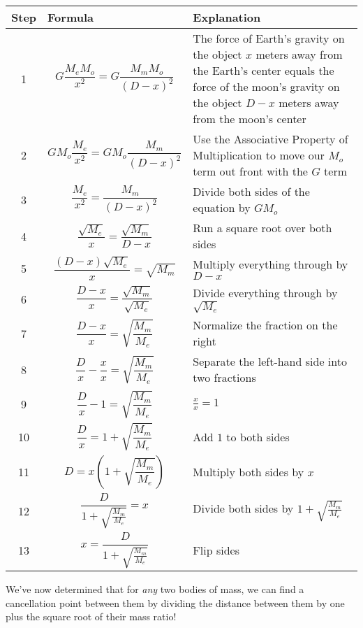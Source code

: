 \documentclass[10pt,letterpaper]{report}
\begin{document}
\begin{longtable}{| c | p{} | p{} |}
  \hline
  Step & Formula & Explanation \\
  \hline \endhead
  \rowcolor[gray]{0.95} 1 & \[ G\frac{M_e M_o}{x^2} = G\frac{M_m M_o}{(D - x)^2} \] & The
    force of Earth's gravity on the object $x$ meters away from the
    Earth's center equals the force of the moon's gravity on the
    object $D - x$ meters away from the moon's center\\
    \hline
  2 & \[ GM_o \frac{M_e}{x^2} = GM_o\frac{M_m}{(D - x)^2} \] & Use the
  Associative Property of Multiplication to move our $M_o$ term out
  front with the $G$ term \\
  \hline
  \rowcolor[gray]{0.95} 3 & \[ \frac{M_e}{x^2} = \frac{M_m}{(D - x)^2} \] & Divide both
  sides of the equation by $GM_o$ \\
  \hline
  4 & \[ \frac{\sqrt{M_e}}{x} = \frac{\sqrt{M_m}}{D - x} \] & Run a
  square root over both sides \\
  \hline
  \rowcolor[gray]{0.95} 5 & \[ \frac{(D-x)\sqrt{M_e}}{x} = \sqrt{M_m} \] & Multiply
  everything through by $D - x$ \\
  \hline
  6 & \[ \frac{D-x}{x} = \frac{\sqrt{M_m}}{\sqrt{M_e}} \] & Divide
  everything through by $\sqrt{M_e}$ \\
  \hline
  \rowcolor[gray]{0.95} 7 & \[ \frac{D - x}{x} = \sqrt{\frac{M_m}{M_e}} \] & Normalize the
  fraction on the right \\
  \hline
  8 & \[ \frac{D}{x} - \frac{x}{x} = \sqrt{\frac{M_m}{M_e}} \] &
  Separate the left-hand side into two fractions \\
  \hline
  \rowcolor[gray]{0.95} 9 & \[ \frac{D}{x} - 1 =
  \sqrt{\frac{M_m}{M_e}} \] & $\frac{x}{x} = 1$ \\
  \hline
  10 & \[ \frac{D}{x} = 1 + \sqrt{\frac{M_m}{M_e}} \] & Add $1$ to
  both sides \\
  \hline
  \rowcolor[gray]{0.95} 11 & \[ D = x\left( 1 + \sqrt{\frac{M_m}{M_e}}\right) \] & Multiply both sides by
  $x$ \\
  \hline
  12 & \[ \frac{D}{1 + \sqrt{\frac{M_m}{M_e}}} = x \] & Divide both
  sides by $1 + \sqrt{\frac{M_m}{M_e}}$\\
  \hline
  \rowcolor[gray]{0.95} 13 & \[ x = \frac{D}{1 + \sqrt{\frac{M_m}{M_e}}} \] & Flip sides \\
  \hline
\end{longtable}

We've now determined that for \textit{any} two bodies of mass, we
can find a cancellation point between them by dividing the distance
between them by one plus the square root of their mass ratio!
\end{document}
